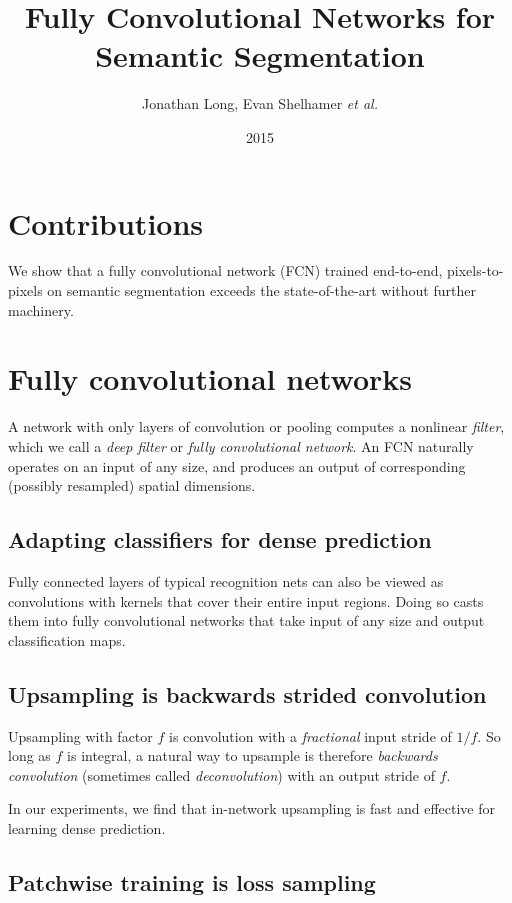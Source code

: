 \documentclass[a4paper,12pt]{article}
\title{Fully Convolutional Networks for Semantic Segmentation}
\author{Jonathan Long, Evan Shelhamer \emph{et al.}}
\date{2015}
\begin{document}
  \maketitle

\section{Contributions}

We show that a fully convolutional network (FCN) trained end-to-end, pixels-to-pixels on semantic segmentation exceeds the state-of-the-art without further machinery.

\section{Fully convolutional networks}

A network with only layers of convolution or pooling computes a nonlinear \emph{filter}, which we call a \emph{deep filter} or \emph{fully convolutional network}. An FCN naturally operates on an input of any size, and produces an output of corresponding (possibly resampled) spatial dimensions.

\subsection{Adapting classifiers for dense prediction}

Fully connected layers of typical recognition nets can also be viewed as convolutions with kernels that cover their entire input regions. Doing so casts them into fully convolutional networks that take input of any size and output classification maps.

\subsection{Upsampling is backwards strided convolution}

Upsampling with factor $f$ is convolution with a \emph{fractional} input stride of $1/f$. So long as $f$ is integral, a natural way to upsample is therefore \emph{backwards convolution} (sometimes called \emph{deconvolution}) with an output stride of $f$.

In our experiments, we find that in-network upsampling is fast and effective for learning dense prediction.

\subsection{Patchwise training is loss sampling}
\end{document}
